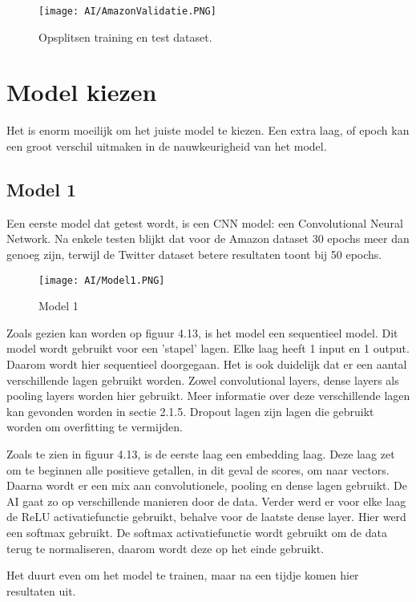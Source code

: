 \begin{figure}[!htbp]
    \texttt{[image: AI/AmazonValidatie.PNG]}
    \caption{\label{amazonopsplitsing}Opsplitsen training en test dataset.}
\end{figure}
\FloatBarrier

\section{Model kiezen}
\label{proofofconceptdatamodel}
Het is enorm moeilijk om het juiste model te kiezen. Een extra laag, of epoch kan een groot verschil uitmaken in de nauwkeurigheid van het model. 

\subsection{Model 1}

Een eerste model dat getest wordt, is een CNN model: een Convolutional Neural Network. Na enkele testen blijkt dat voor de Amazon dataset 30 epochs meer dan genoeg zijn, terwijl de Twitter dataset betere resultaten toont bij 50 epochs.
\begin{figure}[!htbp]
    \texttt{[image: AI/Model1.PNG]}
    \caption{\label{model1}Model 1}
\end{figure}
\FloatBarrier

Zoals gezien kan worden op figuur 4.13, is het model een sequentieel model. Dit model wordt gebruikt voor een 'stapel' lagen. Elke laag heeft 1 input en 1 output. Daarom wordt hier sequentieel doorgegaan. Het is ook duidelijk dat er een aantal verschillende lagen gebruikt worden. Zowel convolutional layers, dense layers als pooling layers worden hier gebruikt. Meer informatie over deze verschillende lagen kan gevonden worden in sectie 2.1.5. Dropout lagen zijn lagen die gebruikt worden om overfitting te vermijden. 

Zoals te zien in figuur 4.13, is de eerste laag een embedding laag. Deze laag zet om te beginnen alle positieve getallen, in dit geval de scores, om naar vectors. Daarna wordt er een mix aan convolutionele, pooling en dense lagen gebruikt. De AI gaat zo op verschillende manieren door de data. Verder werd er voor elke laag de ReLU activatiefunctie gebruikt, behalve voor de laatste dense layer. Hier werd een softmax gebruikt. De softmax activatiefunctie wordt gebruikt om de data terug te normaliseren, daarom wordt deze op het einde gebruikt.   

Het duurt even om het model te trainen, maar na een tijdje komen hier resultaten uit. 

